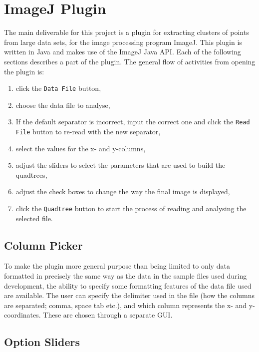 
\section{ImageJ Plugin}
\label{sec:imagej_plugin}

The main deliverable for this project is a plugin for extracting clusters of
points from large data sets, for the image processing program ImageJ. This
plugin is written in Java and makes use of the ImageJ Java API\cite{imagejapi}.
Each of the following sections describes a part of the plugin. The general flow
of activities from opening the plugin is:

\begin{enumerate}
	\item click the \texttt{Data File} button,
	\item choose the data file to analyse,
	\item If the default separator is incorrect, input the correct one and
		click the \texttt{Read File} button to re-read with the new separator,
	\item select the values for the x- and y-columns,
	\item adjust the sliders to select the parameters that are used to build
		the quadtrees,
	\item adjust the check boxes to change the way the final image is
		displayed,
	\item click the \texttt{Quadtree} button to start the process of reading
		and analysing the selected file.
\end{enumerate}

\subsection{Column Picker}
\label{sub:column_picker}

To make the plugin more general purpose than being limited to only data
formatted in precisely the same way as the data in the sample files used during
development, the ability to specify some formatting features of the data file
used are available. The user can specify the delimiter used in the file (how
the columns are separated; comma, space tab etc.), and which column represents
the x- and y-coordinates. These are chosen through a separate GUI\@.

\subsection{Option Sliders}
\label{sub:option_sliders}

